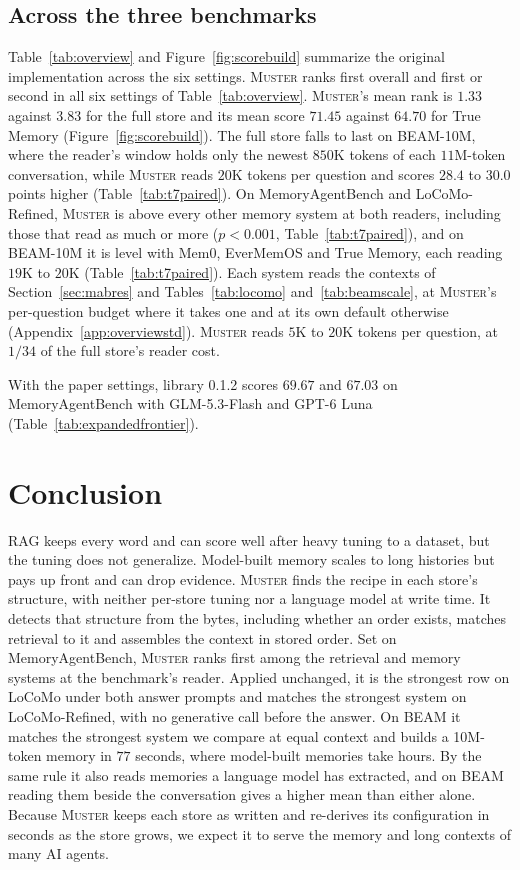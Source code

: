 \documentclass{article}
\newcommand{\sys}{\textsc{Muster}}
\begin{document}
\subsection{Across the three benchmarks}\label{sec:across}

Table~\ref{tab:overview} and Figure~\ref{fig:scorebuild} summarize the original implementation across the six settings. \sys{} ranks first overall and first or second in all six settings of Table~\ref{tab:overview}. \sys{}'s mean rank is $1.33$ against $3.83$ for the full store and its mean score $71.45$ against $64.70$ for True Memory (Figure~\ref{fig:scorebuild}). The full store falls to last on BEAM-10M, where the reader's window holds only the newest $850$K tokens of each $11$M-token conversation, while \sys{} reads $20$K tokens per question and scores $28.4$ to $30.0$ points higher (Table~\ref{tab:t7paired}). On MemoryAgentBench and LoCoMo-Refined, \sys{} is above every other memory system at both readers, including those that read as much or more ($p<0.001$, Table~\ref{tab:t7paired}), and on BEAM-10M it is level with Mem0, EverMemOS and True Memory, each reading $19$K to $20$K (Table~\ref{tab:t7paired}). Each system reads the contexts of Section~\ref{sec:mabres} and Tables~\ref{tab:locomo} and~\ref{tab:beamscale}, at \sys{}'s per-question budget where it takes one and at its own default otherwise (Appendix~\ref{app:overviewstd}). \sys{} reads $5$K to $20$K tokens per question, at $1/34$ of the full store's reader cost.

With the paper settings, library 0.1.2 scores $69.67$ and $67.03$ on MemoryAgentBench with GLM-5.3-Flash and GPT-6 Luna (Table~\ref{tab:expandedfrontier}).

\FloatBarrier
\section{Conclusion}

RAG keeps every word and can score well after heavy tuning to a dataset, but the tuning does not generalize. Model-built memory scales to long histories but pays up front and can drop evidence. \sys{} finds the recipe in each store's structure, with neither per-store tuning nor a language model at write time. It detects that structure from the bytes, including whether an order exists, matches retrieval to it and assembles the context in stored order. Set on MemoryAgentBench, \sys{} ranks first among the retrieval and memory systems at the benchmark's reader. Applied unchanged, it is the strongest row on LoCoMo under both answer prompts and matches the strongest system on LoCoMo-Refined, with no generative call before the answer. On BEAM it matches the strongest system we compare at equal context and builds a 10M-token memory in $77$ seconds, where model-built memories take hours. By the same rule it also reads memories a language model has extracted, and on BEAM reading them beside the conversation gives a higher mean than either alone. Because \sys{} keeps each store as written and re-derives its configuration in seconds as the store grows, we expect it to serve the memory and long contexts of many AI agents.
\end{document}
